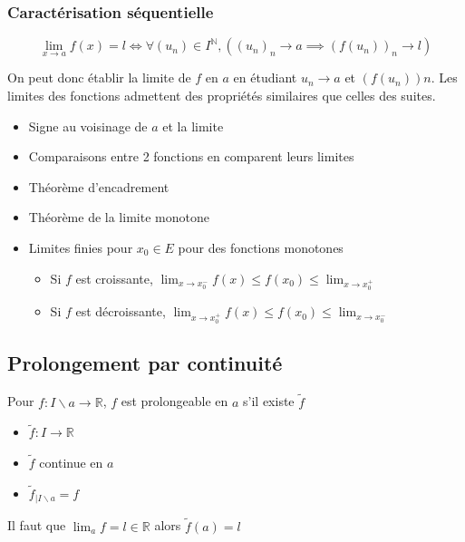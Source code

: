 \documentclass[openany]{book}
\begin{document}
\subsubsection{Caractérisation séquentielle}
 \[ \lim_{x \rightarrow a} f(x) = l \iff \forall (u_n) \in I^{\mathbb{N}}, ( (u_n)_n \longrightarrow a \implies (f(u_n))_n \longrightarrow l ) \]

\noindent On peut donc établir la limite de $f$ en $a$ en étudiant $u_n \longrightarrow a$ et $ (f(u_n))n $. Les limites des fonctions admettent des propriétés similaires que celles des suites.
\begin{itemize}
    \item Signe au voisinage de $a$ et la limite
    \item Comparaisons entre 2 fonctions en comparent leurs limites
    \item Théorème d'encadrement
    \item Théorème de la limite monotone
    \item Limites finies pour $x_0 \in E$ pour des fonctions monotones
    \begin{itemize}
        \item Si $f$ est croissante, $ \lim_{x \rightarrow x_0^-} f(x) \leq f(x_0) \leq \lim_{x \rightarrow x_0^+} $
        \item Si $f$ est décroissante, $ \lim_{x \rightarrow x_0^+} f(x) \leq f(x_0) \leq \lim_{x \rightarrow x_0^-} $
    \end{itemize}
\end{itemize} 

\subsection{Prolongement par continuité}
Pour $ f: I \backslash {a} \rightarrow \mathbb{R} $, $f$ est prolongeable en $a$ s'il existe $\tilde{f}$
\begin{itemize}
    \item $\tilde{f} : I \rightarrow \mathbb{R}$
    \item $\tilde{f}$ continue en $a$
    \item $\tilde{f}_{|I \backslash {a}} = f$
\end{itemize}

\noindent Il faut que $\lim_a f = l \in \mathbb{R}$ alors $\tilde{f}(a) = l$
\end{document}
